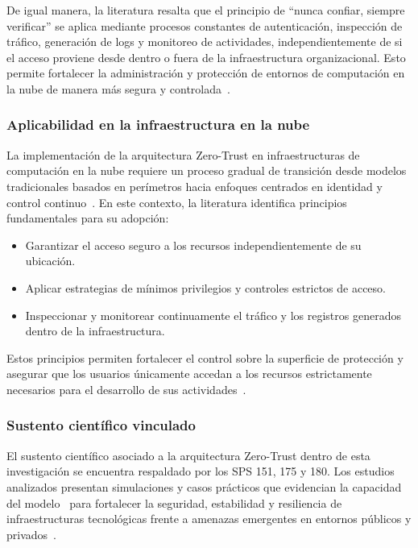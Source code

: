 De igual manera, la literatura resalta que el principio de ``nunca confiar, siempre verificar'' se aplica mediante procesos constantes de 
autenticación, inspección de tráfico, generación de logs y monitoreo de actividades, independientemente de si el acceso proviene desde 
dentro o fuera de la infraestructura organizacional. Esto permite fortalecer la administración y protección de entornos de computación en 
la nube de manera más segura y controlada~\cite{stojalowski2024zero}.

\subsubsection{Aplicabilidad en la infraestructura en la nube}

La implementación de la arquitectura Zero-Trust en infraestructuras de computación en la nube requiere un proceso gradual de transición 
desde modelos tradicionales basados en perímetros hacia enfoques centrados en identidad y control continuo~\cite{stojalowski2024zero}. 
En este contexto, la literatura identifica principios fundamentales para su adopción:

\begin{itemize}
	\item Garantizar el acceso seguro a los recursos independientemente de su ubicación.
	
	\item Aplicar estrategias de mínimos privilegios y controles estrictos de acceso.
	
	\item Inspeccionar y monitorear continuamente el tráfico y los registros generados dentro de la infraestructura.
\end{itemize}

Estos principios permiten fortalecer el control sobre la superficie de protección y asegurar que los usuarios únicamente accedan a los 
recursos estrictamente necesarios para el desarrollo de sus actividades~\cite{stojalowski2024zero}.

\subsubsection{Sustento científico vinculado}

El sustento científico asociado a la arquitectura Zero-Trust dentro de esta investigación se encuentra respaldado por los SPS 151, 175 y 
180. Los estudios analizados presentan simulaciones y casos prácticos que evidencian la capacidad del modelo \ZTA\ para fortalecer la 
seguridad, estabilidad y resiliencia de infraestructuras tecnológicas frente a amenazas emergentes en entornos públicos y 
privados~\cite{bennaceur2026zero}.

